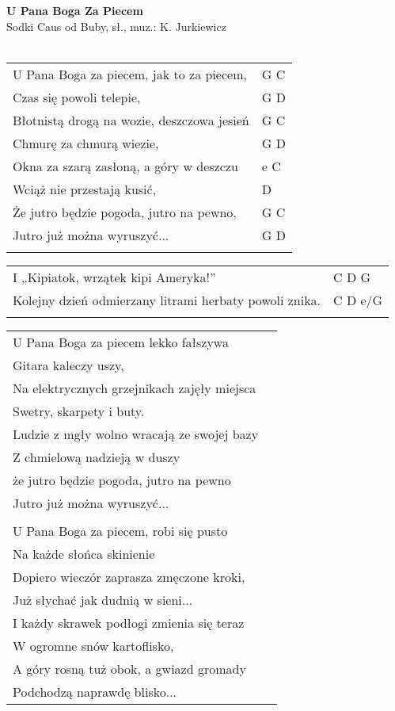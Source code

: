 \documentclass[a5paper]{article}
\begin{document}


\noindent
\fontsize{12pt}{15pt}\selectfont
\textbf{U Pana Boga Za Piecem} \\
\fontsize{8pt}{10pt}\selectfont
Sodki Caus od Buby, sł., muz.: K. Jurkiewicz \\ \\
\fontsize{10pt}{12pt}\selectfont
{}
\begin{tabular}{@{}p{9.5cm}p{3cm}@{}}
\noindent
U Pana Boga za piecem, jak to za piecem, & G C \\
Czas się powoli telepie, & G D \\
Błotnistą drogą na wozie, deszczowa jesień & G C \\
Chmurę za chmurą wiezie, & G D \\
Okna za szarą zasłoną, a góry w deszczu & e C \\
Wciąż nie przestają kusić, & D \\
Że jutro będzie pogoda, jutro na pewno, & G C \\
Jutro już można wyruszyć... & G D \\ \\
\end{tabular}

\noindent
\begin{tabular}{@{}p{8.5cm}p{3cm}@{}}
I „Kipiatok, wrzątek kipi Ameryka!” & C D G \\
Kolejny dzień odmierzany litrami herbaty powoli znika. & C D e/G \\ \\
\end{tabular}

\noindent
\begin{tabular}{@{}p{8.5cm}p{3cm}@{}}
U Pana Boga za piecem lekko fałszywa \\
Gitara kaleczy uszy, \\
Na elektrycznych grzejnikach zajęły miejsca \\
Swetry, skarpety i buty. \\
Ludzie z mgły wolno wracają ze swojej bazy \\
Z chmielową nadzieją w duszy \\
że jutro będzie pogoda, jutro na pewno \\
Jutro już można wyruszyć... \\ \\

U Pana Boga za piecem, robi się pusto \\
Na każde słońca skinienie \\
Dopiero wieczór zaprasza zmęczone kroki, \\
Już słychać jak dudnią w sieni... \\
I każdy skrawek podłogi zmienia się teraz \\
W ogromne snów kartoflisko, \\
A góry rosną tuż obok, a gwiazd gromady \\
Podchodzą naprawdę blisko... 
\end{tabular}
\end{document}
